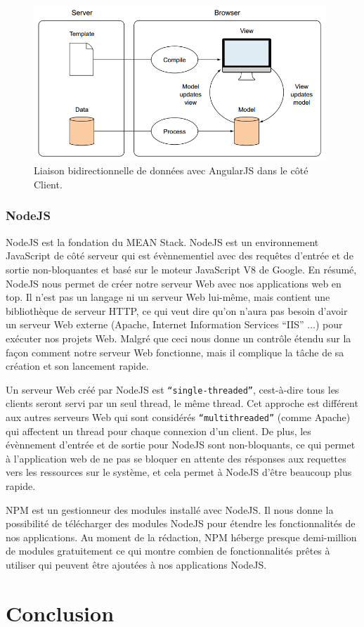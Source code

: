 \begin{figure}[H]
    \centering
    \includegraphics[width=11cm]{images/two-way-data-binding.png}
    \caption{Liaison bidirectionnelle de données avec AngularJS dans le côté Client.}
    \label{fig:two-way-data-binding}
\end{figure}

\subsubsection{NodeJS}

NodeJS est la fondation du MEAN Stack. NodeJS est un environnement JavaScript de côté serveur qui est évènnementiel avec des requêtes d'entrée et de sortie non-bloquantes et basé sur le moteur JavaScript V8 de Google. En résumé, NodeJS nous permet de créer notre serveur Web avec nos applications web en top. Il n'est pas un langage ni un serveur Web lui-même, mais contient une bibliothèque de serveur HTTP, ce qui veut dire qu'on n'aura pas besoin d'avoir un serveur Web externe (Apache, Internet Information Services ``IIS'' ...) pour exécuter nos projets Web. Malgré que ceci nous donne un contrôle étendu sur la façon comment notre serveur Web fonctionne, mais il complique la tâche de sa création et son lancement rapide.
\newline

Un serveur Web créé par NodeJS est \texttt{``single-threaded''}, cest-à-dire tous les clients seront servi par un seul thread, le même thread. Cet approche est différent aux autres serveurs Web qui sont considérés \texttt{``multithreaded''} (comme Apache) qui affectent un thread pour chaque connexion d'un client. De plus, les évènnement d'entrée et de sortie pour NodeJS sont non-bloquants\cite{blockingVSnonBlocking}, ce qui permet à l'application web de ne pas se bloquer en attente des résponses aux requettes vers les ressources sur le système, et cela permet à NodeJS d'être beaucoup plus rapide\cite{nodeJSvsPHP}.
\newline

NPM est un gestionneur des modules installé avec NodeJS. Il nous donne la possibilité de télécharger des modules NodeJS pour étendre les fonctionnalités de nos applications. Au moment de la rédaction, NPM héberge presque demi-million de modules gratuitement ce qui montre combien de fonctionnalités prêtes à utiliser qui peuvent être ajoutées à nos applications NodeJS.

\section{Conclusion}
